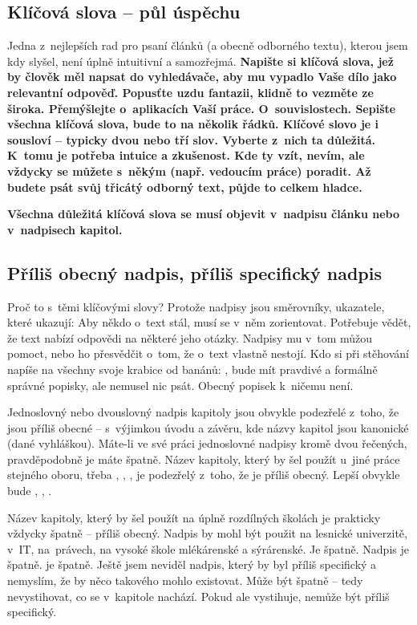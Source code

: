 \subsection*{Klíčová slova -- půl úspěchu}
Jedna z~nejlepších rad pro psaní článků (a obecně odborného textu), kterou jsem kdy slyšel, není úplně intuitivní a samozřejmá.
\bf Napište si klíčová slova, jež by člověk měl napsat do vyhledávače, aby mu vypadlo Vaše dílo jako relevantní odpověď. \rm 
Popusťte uzdu fantazii, klidně to vezměte ze široka. Přemýšlejte o~aplikacích Vaší práce. O~souvislostech. Sepište všechna klíčová slova, bude to na několik řádků. Klíčové slovo je i sousloví -- typicky dvou nebo tří slov. Vyberte z~nich ta důležitá. K~tomu je potřeba intuice a zkušenost. Kde ty vzít, nevím, ale vždycky se můžete s~někým (např. vedoucím práce) poradit. Až budete psát svůj třicátý odborný text, půjde to celkem hladce.

\bf Všechna důležitá klíčová slova se musí objevit v~nadpisu článku nebo v~nadpisech kapitol. \rm 

\subsection*{Příliš obecný nadpis, příliš specifický nadpis}
Proč to s~těmi klíčovými slovy? Protože nadpisy jsou směrovníky, ukazatele, které ukazují:  Aby někdo o~text stál, musí se v~něm zorientovat. Potřebuje vědět, že text nabízí odpovědi na některé jeho otázky. Nadpisy mu v~tom můžou pomoct, nebo ho přesvědčit o~tom, že o~text vlastně nestojí. Kdo si při stěhování napíše na všechny svoje krabice od banánů: , bude mít pravdivé a formálně správné popisky, ale nemusel nic psát. Obecný popisek k~ničemu není.

Jednoslovný nebo dvouslovný nadpis kapitoly jsou obvykle podezřelé z~toho, že jsou příliš obecné -- s~výjimkou úvodu a závěru, kde názvy kapitol jsou kanonické (dané vyhláškou). Máte-li ve své práci jednoslovné nadpisy kromě dvou řečených, pravděpodobně je máte špatně. Název kapitoly, který by šel použít u~jiné práce stejného oboru, třeba , , , je podezřelý z~toho, že je příliš obecný. Lepší obvykle bude , , .

Název kapitoly, který by šel použít na úplně rozdílných školách je prakticky vždycky špatně -- příliš obecný. Nadpis  by mohl být použit na lesnické univerzitě, v~IT, na~právech, na vysoké škole mlékárenské a sýrárenské. Je špatně. Nadpis  je špatně.  je špatně. Ještě jsem neviděl nadpis, který by byl příliš specifický a nemyslím, že by něco takového mohlo existovat. Může být špatně -- tedy nevystihovat, co se v~kapitole nachází. Pokud ale vystihuje, nemůže být příliš specifický.

